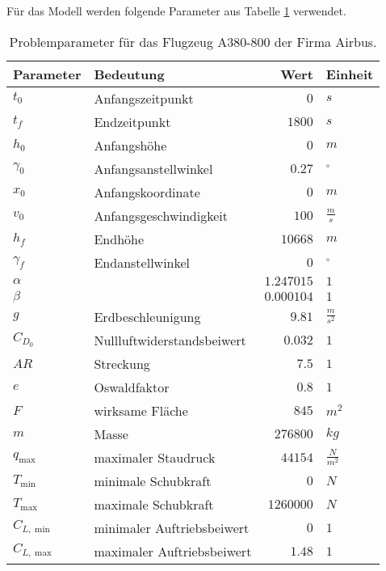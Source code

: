 Für das Modell werden folgende Parameter aus Tabelle \ref{tab:ProblemPara} verwendet.
\begin{table}[H]
    \centering
    \caption{Problemparameter für das Flugzeug A380-800 der Firma Airbus.}\label{tab:ProblemPara}
    \begin{tabularx}{.9\textwidth}{lXrl}
        \toprule
        \textbf{Parameter}   & \textbf{Bedeutung} & \textbf{Wert} & \textbf{Einheit} \\ 
        \midrule
        $t_0$       & Anfangszeitpunkt & $0$ & $s$ \\ 
        $t_f$       & Endzeitpunkt & $1800$ & $s$ \\ 
        \hline
        $h_0$       & Anfangshöhe & $0$ & $m$ \\ 
        $\gamma_0$  & Anfangsanstellwinkel & $0.27$ & $^{\circ}$ \\
        $x_0$       & Anfangskoordinate & $0$ & $m$ \\ 
        $v_0$       & Anfangsgeschwindigkeit & $100$ & $\frac{m}{s}$ \\ 
        \hline
        $h_f$       & Endhöhe & $10668$ & $m$ \\ 
        $\gamma_f$  & Endanstellwinkel & $0$ & $^{\circ}$ \\
        \hline
        $\alpha$    &  & $1.247015$ & $1$\\ 
        $\beta$     &  & $0.000104$ & $1$\\
        $g$         & Erdbeschleunigung & $9.81$ & $\frac{m}{s^2}$ \\ 
        $C_{D_0}$   & Nullluftwiderstandsbeiwert & $0.032$ & $1$\\ 
        $AR$        & Streckung & $7.5$ & $1$\\ 
        $e$         & Oswaldfaktor & $0.8$ & $1$\\ 
        $F$         & wirksame Fläche & $845$ & $m^2$ \\ 
        $m$         & Masse & $276800$ & $kg$ \\ 
        $q_{\max}$  & maximaler Staudruck & $44154$ & $\frac{N}{m^2}$ \\
        $T_{\min}$  & minimale Schubkraft & $0$ & $N$ \\  
        $T_{\max}$  & maximale Schubkraft & $1260000$ & $N$ \\ 
        $C_{L, \min}$ & minimaler Auftriebsbeiwert & $0$ & $1$ \\ 
        $C_{L, \max}$ & maximaler Auftriebsbeiwert & $1.48$ & $1$ \\ 
        \bottomrule
    \end{tabularx} 
\end{table}



